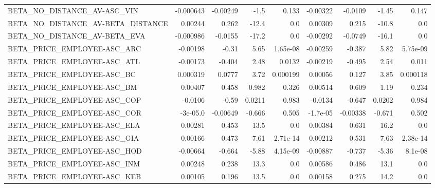 \begin{tabular}{lrrrrrrrr}
BETA\_NO\_DISTANCE\_AV-ASC\_VIN             &   -0.000643 &     -0.00249 &    -1.5 &    0.133 &   -0.00322 &     -0.0109 &        -1.45 &         0.147 \\
BETA\_NO\_DISTANCE\_AV-BETA\_DISTANCE       &     0.00244 &        0.262 &   -12.4 &      0.0 &    0.00309 &       0.215 &        -10.8 &           0.0 \\
BETA\_NO\_DISTANCE\_AV-BETA\_EVA            &   -0.000986 &      -0.0155 &   -17.2 &      0.0 &   -0.00292 &     -0.0749 &        -16.1 &           0.0 \\
BETA\_PRICE\_EMPLOYEE-ASC\_ARC             &    -0.00198 &        -0.31 &    5.65 & 1.65e-08 &   -0.00259 &      -0.387 &         5.82 &      5.75e-09 \\
BETA\_PRICE\_EMPLOYEE-ASC\_ATL             &    -0.00173 &       -0.404 &    2.48 &   0.0132 &   -0.00219 &      -0.495 &         2.54 &         0.011 \\
BETA\_PRICE\_EMPLOYEE-ASC\_BC              &    0.000319 &       0.0777 &    3.72 & 0.000199 &    0.00056 &       0.127 &         3.85 &      0.000118 \\
BETA\_PRICE\_EMPLOYEE-ASC\_BM              &     0.00407 &        0.458 &   0.982 &    0.326 &    0.00514 &       0.609 &         1.19 &         0.234 \\
BETA\_PRICE\_EMPLOYEE-ASC\_COP             &     -0.0106 &        -0.59 &  0.0211 &    0.983 &    -0.0134 &      -0.647 &       0.0202 &         0.984 \\
BETA\_PRICE\_EMPLOYEE-ASC\_COR             &    -3e-05.0 &     -0.00649 &  -0.666 &    0.505 &   -1.7e-05 &    -0.00338 &       -0.671 &         0.502 \\
BETA\_PRICE\_EMPLOYEE-ASC\_ELA             &     0.00281 &        0.453 &    13.5 &      0.0 &    0.00384 &       0.631 &         16.2 &           0.0 \\
BETA\_PRICE\_EMPLOYEE-ASC\_GIA             &     0.00166 &        0.473 &    7.61 & 2.71e-14 &    0.00212 &       0.531 &         7.63 &      2.38e-14 \\
BETA\_PRICE\_EMPLOYEE-ASC\_HOD             &    -0.00664 &       -0.664 &   -5.88 & 4.15e-09 &   -0.00887 &      -0.737 &        -5.36 &       8.1e-08 \\
BETA\_PRICE\_EMPLOYEE-ASC\_INM             &     0.00248 &        0.238 &    13.3 &      0.0 &    0.00586 &       0.486 &         13.1 &           0.0 \\
BETA\_PRICE\_EMPLOYEE-ASC\_KEB             &     0.00105 &        0.196 &    13.5 &      0.0 &    0.00158 &       0.275 &         14.2 &           0.0 \\

\end{tabular}
